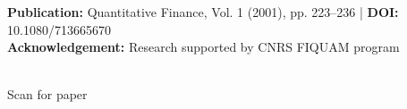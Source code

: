 \documentclass[final]{beamer}
\begin{document}
\begin{frame}[t]
\begin{tcolorbox}[colback=white,colframe=headerred,boxrule=2pt,arc=0pt,
    left=10pt,right=10pt,top=5pt,bottom=5pt]
\begin{minipage}{0.7\linewidth}
\large
\textbf{Publication:} Quantitative Finance, Vol. 1 (2001), pp. 223--236 | \textbf{DOI:} 10.1080/713665670\\
\textbf{Acknowledgement:} Research supported by CNRS FIQUAM program
\end{minipage}
\hfill
\begin{minipage}{0.25\linewidth}
\centering
{}\\
{\small Scan for paper}
\end{minipage}
\end{tcolorbox}

\end{frame}
\end{document}
